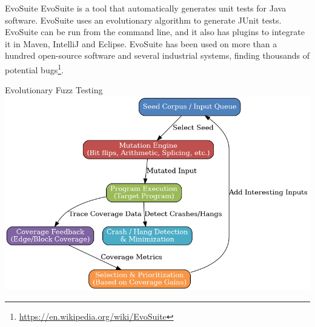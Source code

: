 \documentclass{beamer}
\begin{document}
\begin{frame}[t]{EvoSuite}
    EvoSuite is a tool that automatically generates unit tests for Java software. EvoSuite uses an evolutionary algorithm to generate JUnit tests. EvoSuite can be run from the command line, and it also has plugins to integrate it in Maven, IntelliJ and Eclipse. EvoSuite has been used on more than a hundred open-source software and several industrial systems, finding thousands of potential bugs\footnote{\url{https://en.wikipedia.org/wiki/EvoSuite}}.
\end{frame}

\begin{frame}[t]{Evolutionary Fuzz Testing}
    \includegraphics[width=.5\textwidth]{images/evo_fuzz.png} 
\end{frame}
\end{document}
